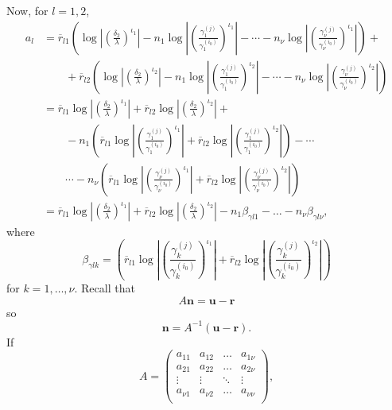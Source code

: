 Now, for $l = 1,2$, 
\begin{align*}
a_l 	& = \overline{r}_{l1}\left(\log\left|\left(\frac{\delta_2}{\lambda}\right)^{\iota_1}\right| - 
	n_1\log\left| \left( \frac{\gamma_1^{(j)}}{\gamma_1^{(i_0)}}\right)^{\iota_1}\right| - \cdots -n_{\nu}\log \left|\left( \frac{\gamma_{\nu}^{(j)}}{\gamma_{\nu}^{(i_0)}}\right)^{\iota_1}\right|\right) + \\
	& \quad \quad + \overline{r}_{l2}\left(\log\left|\left(\frac{\delta_2}{\lambda}\right)^{\iota_2}\right| - 
	n_1\log\left| \left( \frac{\gamma_1^{(j)}}{\gamma_1^{(i_0)}}\right)^{\iota_2}\right| - \cdots -n_{\nu}\log \left|\left( \frac{\gamma_{\nu}^{(j)}}{\gamma_{\nu}^{(i_0)}}\right)^{\iota_2}\right|\right)\\
	& = \overline{r}_{l1}\log\left|\left(\frac{\delta_2}{\lambda}\right)^{\iota_1}\right| + \overline{r}_{l2}\log\left|\left(\frac{\delta_2}{\lambda}\right)^{\iota_2}\right| + \\
	& \quad \quad - n_1\left(\overline{r}_{l1} \log\left| \left( \frac{\gamma_1^{(j)}}{\gamma_1^{(i_0)}}\right)^{\iota_1}\right|+ \overline{r}_{l2}\log\left| \left( \frac{\gamma_1^{(j)}}{\gamma_1^{(i_0)}}\right)^{\iota_2}\right|\right) - \cdots \\
	& \quad \quad \cdots - n_{\nu} \left(\overline{r}_{l1}\log \left|\left( \frac{\gamma_{\nu}^{(j)}}{\gamma_{\nu}^{(i_0)}}\right)^{\iota_1}\right| + \overline{r}_{l2}\log \left|\left( \frac{\gamma_{\nu}^{(j)}}{\gamma_{\nu}^{(i_0)}}\right)^{\iota_2}\right| \right)  \\
	& = \overline{r}_{l1}\log\left|\left(\frac{\delta_2}{\lambda}\right)^{\iota_1}\right| + \overline{r}_{l2}\log\left|\left(\frac{\delta_2}{\lambda}\right)^{\iota_2}\right| - n_1\beta_{\gamma l 1} - \dots - n_{\nu}\beta_{\gamma l \nu},
\end{align*}
where
\[\beta_{\gamma l k} = \left(\overline{r}_{l1} \log\left| \left( \frac{\gamma_k^{(j)}}{\gamma_k^{(i_0)}}\right)^{\iota_1}\right|+ \overline{r}_{l2}\log\left| \left( \frac{\gamma_k^{(j)}}{\gamma_k^{(i_0)}}\right)^{\iota_2}\right|\right)\]
for $k = 1, \dots, \nu$. Recall that 
\[A\mathbf{n} = \mathbf{u} - \mathbf{r}\]
so
\[\mathbf{n} = A^{-1}(\mathbf{u} - \mathbf{r}).\]
If 
\[A = \begin{pmatrix}
	a_{11} & a_{12} & \dots & a_{1\nu} \\ a_{21} & a_{22} & \dots & a_{2\nu}\\
	\vdots & \vdots & \ddots & \vdots\\ a_{\nu 1} & a_{\nu 2} & \dots & a_{\nu\nu}\\ 
	\end{pmatrix},\]
